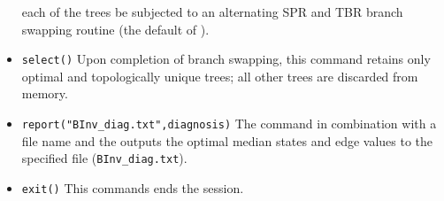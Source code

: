 \begin{itemize}
each of the trees be subjected to an alternating SPR and TBR branch
swapping routine (the default of \poy).  
\item \texttt{select()} Upon completion of branch swapping, this 
command retains only optimal and topologically unique trees; 
all other trees are discarded from memory.  
\item \texttt{report("BInv\_diag.txt",diagnosis)}  The
 command in combination with a file name and the
 outputs the optimal median states and edge
values to the specified file (\texttt{BInv\_diag.txt}).  
\item \texttt{exit()} This commands ends the \poy session.
\end{itemize}



